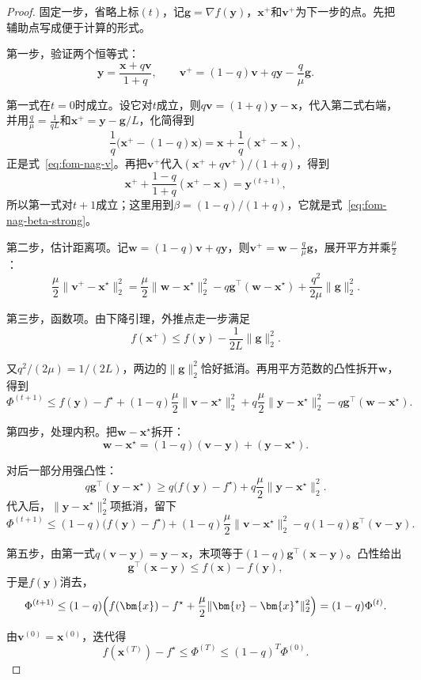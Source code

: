 \begin{proof}
固定一步，省略上标$(t)$，记$\bm{g}=\nabla f(\bm{y})$，$\bm{x}^+$和$\bm{v}^+$为下一步的点。先把辅助点写成便于计算的形式。

第一步，验证两个恒等式：
\[
 \bm{y}=\frac{\bm{x}+q\bm{v}}{1+q},\qquad
 \bm{v}^+=(1-q)\bm{v}+q\bm{y}-\frac q\mu\bm{g}.
\]

第一式在$t=0$时成立。设它对$t$成立，则$q\bm{v}=(1+q)\bm{y}-\bm{x}$，代入第二式右端，并用$\frac{q}{\mu}=\frac{1}{qL}$和$\bm{x}^+=\bm{y}-\bm{g}/L$，化简得到
\[
 \frac1q\bigl(\bm{x}^+-(1-q)\bm{x}\bigr)=\bm{x}+\frac1q(\bm{x}^+-\bm{x}),
\]
正是式~\eqref{eq:fom-nag-v}。再把$\bm{v}^+$代入$(\bm{x}^++q\bm{v}^+)/(1+q)$，得到
\[
 \bm{x}^++\frac{1-q}{1+q}(\bm{x}^+-\bm{x})=\bm{y}^{(t+1)},
\]
所以第一式对$t+1$成立；这里用到$\beta=(1-q)/(1+q)$，它就是式~\eqref{eq:fom-nag-beta-strong}。

第二步，估计距离项。记$\bm{w}=(1-q)\bm{v}+q\bm{y}$，则$\bm{v}^+=\bm{w}-\frac q\mu\bm{g}$，展开平方并乘$\frac\mu2$：
\[
 \frac\mu2\lVert\bm{v}^+-\bm{x}^\star\rVert_2^2
 =\frac\mu2\lVert\bm{w}-\bm{x}^\star\rVert_2^2-q\bm{g}^\top(\bm{w}-\bm{x}^\star)+\frac{q^2}{2\mu}\lVert\bm{g}\rVert_2^2.
\]

第三步，函数项。由下降引理，外推点走一步满足
\[
 f(\bm{x}^+)\leq f(\bm{y})-\frac{1}{2L}\lVert\bm{g}\rVert_2^2.
\]

又$q^2/(2\mu)=1/(2L)$，两边的$\lVert\bm{g}\rVert_2^2$恰好抵消。再用平方范数的凸性拆开$\bm{w}$，得到
\[
 \Phi^{(t+1)}\leq f(\bm{y})-f^\star+(1-q)\frac\mu2\lVert\bm{v}-\bm{x}^\star\rVert_2^2+q\frac\mu2\lVert\bm{y}-\bm{x}^\star\rVert_2^2-q\bm{g}^\top(\bm{w}-\bm{x}^\star).
\]

第四步，处理内积。把$\bm{w}-\bm{x}^\star$拆开：
\[
 \bm{w}-\bm{x}^\star=(1-q)(\bm{v}-\bm{y})+(\bm{y}-\bm{x}^\star).
\]

对后一部分用强凸性：
\[
 q\bm{g}^\top(\bm{y}-\bm{x}^\star)\geq q\bigl(f(\bm{y})-f^\star\bigr)+q\frac\mu2\lVert\bm{y}-\bm{x}^\star\rVert_2^2.
\]
代入后，$\lVert\bm{y}-\bm{x}^\star\rVert_2^2$项抵消，留下
\[
 \Phi^{(t+1)}\leq(1-q)\bigl(f(\bm{y})-f^\star\bigr)+(1-q)\frac\mu2\lVert\bm{v}-\bm{x}^\star\rVert_2^2-q(1-q)\bm{g}^\top(\bm{v}-\bm{y}).
\]

第五步，由第一式$q(\bm{v}-\bm{y})=\bm{y}-\bm{x}$，末项等于$(1-q)\bm{g}^\top(\bm{x}-\bm{y})$。凸性给出
\[
 \bm{g}^\top(\bm{x}-\bm{y})\leq f(\bm{x})-f(\bm{y}),
\]
于是$f(\bm{y})$消去，
\[
 \Phi^{(t+1)}\leq(1-q)\Bigl(f(\bm{x})-f^\star+\frac\mu2\lVert\bm{v}-\bm{x}^\star\rVert_2^2\Bigr)=(1-q)\Phi^{(t)}.
\]

由$\bm{v}^{(0)}=\bm{x}^{(0)}$，迭代得
\[
 f(\bm{x}^{(T)})-f^\star\leq\Phi^{(T)}\leq(1-q)^T\Phi^{(0)}.
\]
\end{proof}

